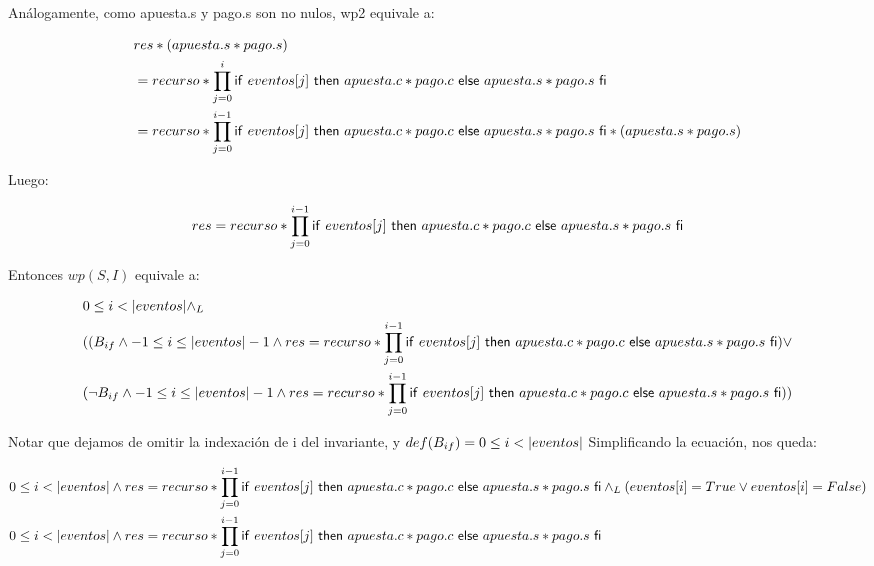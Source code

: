 \documentclass[10pt,a4paper]{article}
\begin{document}
 Análogamente, como apuesta.s y pago.s son no nulos, wp2 equivale a:
   
\begin{equation}
\begin{split}
	& res * (apuesta.s * pago.s)\\
	& = recurso * \prod\limits_{j=0}^{i} \mathsf{if}\ eventos[j]\ \mathsf{then}\ apuesta.c * pago.c\ \mathsf{else}\ apuesta.s * pago.s\ \mathsf{fi}\\
	& = recurso * \prod\limits_{j=0}^{i-1} \mathsf{if}\ eventos[j]\ \mathsf{then}\ apuesta.c * pago.c\ \mathsf{else}\ apuesta.s * pago.s\ \mathsf{fi} * (apuesta.s * pago.s)\\
\end{split}
\end{equation}
   
 Luego:
   
\begin{equation}
	res = recurso * \prod\limits_{j=0}^{i-1} \mathsf{if}\ eventos[j]\ \mathsf{then}\ apuesta.c * pago.c\ \mathsf{else}\ apuesta.s * pago.s\ \mathsf{fi}
\end{equation}
   
 Entonces $wp(S,I)$ equivale a:
   
\begin{equation}
\begin{split}
	& 0 \leq i < \longitud{eventos} \yLuego\\
	& (( B_{if} \land -1 \leq i \leq \longitud{eventos} - 1 \land res = recurso * \prod\limits_{j=0}^{i-1} \IfThenElse{eventos[j]}{apuesta.c * pago.c}{apuesta.s * pago.s} ) \lor\\
   
	& ( \neg B_{if} \land -1 \leq i \leq \longitud{eventos} - 1 \land res = recurso * \prod\limits_{j=0}^{i-1} \IfThenElse{eventos[j]}{apuesta.c * pago.c}{apuesta.s * pago.s} ))
\end{split}
\end{equation}
	
 Notar que dejamos de omitir la indexación de i del invariante, y $def(B_{if}) = 0 \leq i < |eventos|$
 Simplificando la ecuación, nos queda:
   
\begin{equation}
\begin{split}
	& 0 \leq i < \longitud{eventos} \land res = recurso * \prod\limits_{j=0}^{i-1} \IfThenElse{eventos[j]}{apuesta.c * pago.c}{apuesta.s * pago.s} \yLuego (eventos[i] = True \lor eventos[i] = False)\\
   
	& 0 \leq i < \longitud{eventos} \land res = recurso * \prod\limits_{j=0}^{i-1} \IfThenElse{eventos[j]}{apuesta.c * pago.c}{apuesta.s * pago.s}
\end{split}
\end{equation}
   
\end{document}
